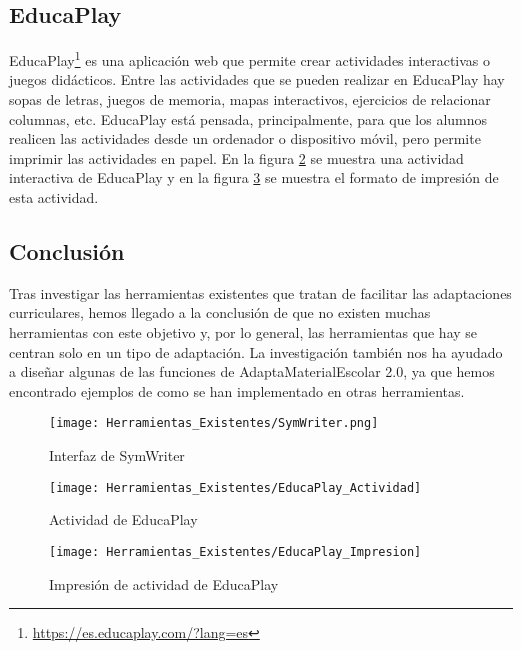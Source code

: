 \subsection{EducaPlay}
EducaPlay\footnote{\url{https://es.educaplay.com/?lang=es}} es una aplicación web que permite crear actividades interactivas o juegos didácticos. Entre las actividades que se pueden realizar en EducaPlay hay sopas de letras, juegos de memoria, mapas interactivos, ejercicios de relacionar columnas, etc. EducaPlay está pensada, principalmente, para que los alumnos realicen las actividades desde un ordenador o dispositivo móvil, pero permite imprimir las actividades en papel. En la figura \ref{fig:EducaPlay_Actividad} se muestra una actividad interactiva de EducaPlay y en la figura \ref{fig:EducaPlay_Impresion} se muestra el formato de impresión de esta actividad.


\subsection{Conclusión}
Tras investigar las herramientas existentes que tratan de facilitar las adaptaciones curriculares, hemos llegado a la conclusión de que no existen muchas herramientas con este objetivo y, por lo general, las herramientas que hay se centran solo en un tipo de adaptación. La investigación también nos ha ayudado a diseñar algunas de las funciones de AdaptaMaterialEscolar 2.0, ya que hemos encontrado ejemplos de como se han implementado en otras herramientas.

\begin{figure}[h!]
    \centering
    \texttt{[image: Herramientas\_Existentes/SymWriter.png]}
    \caption{Interfaz de SymWriter}
    \label{fig:SymWriter}
\end{figure}

\begin{figure}[h!]
    \centering
    \texttt{[image: Herramientas\_Existentes/EducaPlay\_Actividad]}
    \caption{Actividad de EducaPlay}
    \label{fig:EducaPlay_Actividad}
\end{figure}

\begin{figure}[h!]
    \centering
    \texttt{[image: Herramientas\_Existentes/EducaPlay\_Impresion]}
    \caption{Impresión de actividad de EducaPlay}
    \label{fig:EducaPlay_Impresion}
\end{figure}

